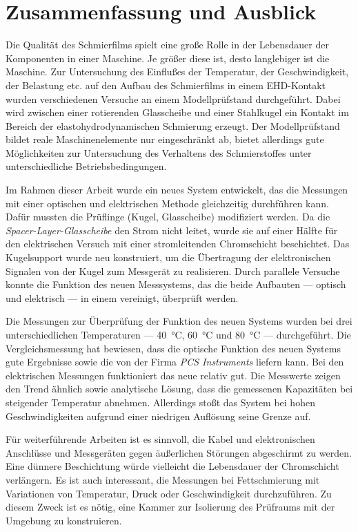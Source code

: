 \chapter{Zusammenfassung und Ausblick}
\label{zusammenfassung_und_ausblick}

Die Qualität des Schmierfilms spielt eine große Rolle in der Lebensdauer der Komponenten in einer Maschine.
Je größer diese ist, desto langlebiger ist die Maschine.
Zur Untersuchung des Einflußes der Temperatur, der Geschwindigkeit, der Belastung etc. auf den Aufbau des Schmierfilms in einem EHD-Kontakt wurden verschiedenen Versuche an einem Modellprüfstand durchgeführt.
Dabei wird zwischen einer rotierenden Glasscheibe und einer Stahlkugel ein Kontakt im Bereich der elastohydrodynamischen Schmierung erzeugt.
Der Modellprüfstand bildet reale Maschinenelemente nur eingeschränkt ab, bietet allerdings gute Möglichkeiten zur Untersuchung des Verhaltens des Schmierstoffes unter unterschiedliche Betriebsbedingungen.

Im Rahmen dieser Arbeit wurde ein neues System entwickelt, das die Messungen mit einer optischen und elektrischen Methode gleichzeitig durchführen kann.
Dafür mussten die Prüflinge (Kugel, Glasscheibe) modifiziert werden.
Da die \textit{Spacer-Layer-Glasscheibe} den Strom nicht leitet, wurde sie auf einer Hälfte für den elektrischen Versuch mit einer stromleitenden Chromschicht beschichtet.
Das Kugelsupport wurde neu konstruiert, um die Übertragung der elektronischen Signalen von der Kugel zum Messgerät zu realisieren.
Durch parallele Versuche konnte die Funktion des neuen Messsystems, das die beide Aufbauten --- optisch und elektrisch --- in einem vereinigt, überprüft werden.

Die Messungen zur Überprüfung der Funktion des neuen Systems wurden bei drei unterschiedlichen Temperaturen --- \SI{40}{\degreeCelsius}, \SI{60}{\degreeCelsius} und \SI{80}{\degreeCelsius} --- durchgeführt.
Die Vergleichsmessung hat bewiesen, dass die optische Funktion des neuen Systems gute Ergebnisse sowie die von der Firma \textit{PCS Instruments} liefern kann.
Bei den elektrischen Messungen funktioniert das neue relativ gut.
Die Messwerte zeigen den Trend ähnlich sowie analytische Lösung, dass die gemessenen Kapazitäten bei steigender Temperatur abnehmen.
Allerdings stoßt das System bei hohen Geschwindigkeiten aufgrund einer niedrigen Auflösung seine Grenze auf.

Für weiterführende Arbeiten ist es sinnvoll, die Kabel und elektronischen Anschlüsse und Messgeräten gegen äußerlichen Störungen abgeschirmt zu werden.
Eine dünnere Beschichtung würde vielleicht die Lebensdauer der Chromschicht verlängern.
Es ist auch interessant, die Messungen bei Fettschmierung mit Variationen von Temperatur, Druck oder Geschwindigkeit durchzuführen.
Zu diesem Zweck ist es nötig, eine Kammer zur Isolierung des Prüfraums mit der Umgebung zu konstruieren.

